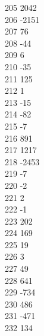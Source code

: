 { 205	2042 \\
 206	-2151 \\
 207	76 \\
 208	-44 \\
 209	6 \\
 210	-35 \\
 211	125 \\
 212	1 \\
 213	-15 \\
 214	-82 \\
 215	-7 \\
 216	891 \\
 217	1217 \\
 218	-2453 \\
 219	-7 \\
 220	-2 \\
 221	2 \\
 222	-1 \\
 223	202 \\
 224	169 \\
 225	19 \\
 226	3 \\
 227	49 \\
 228	641 \\
 229	-734 \\
 230	486 \\
 231	-471 \\
 232	134 \\
}
